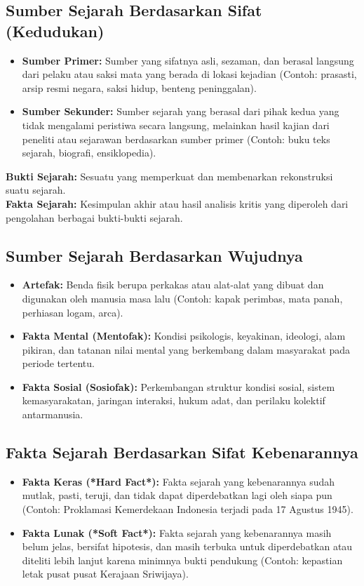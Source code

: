 \documentclass[12pt, a4paper]{article}
\begin{document}
\subsection{Sumber Sejarah Berdasarkan Sifat (Kedudukan)}
\begin{itemize}
	\item \textbf{Sumber Primer:} Sumber yang sifatnya asli, sezaman, dan berasal langsung dari pelaku atau saksi mata yang berada di lokasi kejadian (Contoh: prasasti, arsip resmi negara, saksi hidup, benteng peninggalan).
	\item \textbf{Sumber Sekunder:} Sumber sejarah yang berasal dari pihak kedua yang tidak mengalami peristiwa secara langsung, melainkan hasil kajian dari peneliti atau sejarawan berdasarkan sumber primer (Contoh: buku teks sejarah, biografi, ensiklopedia).
\end{itemize}
\noindent \textbf{Bukti Sejarah:} Sesuatu yang memperkuat dan membenarkan rekonstruksi suatu sejarah.\\
\noindent \textbf{Fakta Sejarah:} Kesimpulan akhir atau hasil analisis kritis yang diperoleh dari pengolahan berbagai bukti-bukti sejarah.

\subsection{Sumber Sejarah Berdasarkan Wujudnya}
\begin{itemize}
	\item \textbf{Artefak:} Benda fisik berupa perkakas atau alat-alat yang dibuat dan digunakan oleh manusia masa lalu (Contoh: kapak perimbas, mata panah, perhiasan logam, arca).
	\item \textbf{Fakta Mental (Mentofak):} Kondisi psikologis, keyakinan, ideologi, alam pikiran, dan tatanan nilai mental yang berkembang dalam masyarakat pada periode tertentu.
	\item \textbf{Fakta Sosial (Sosiofak):} Perkembangan struktur kondisi sosial, sistem kemasyarakatan, jaringan interaksi, hukum adat, dan perilaku kolektif antarmanusia.
\end{itemize}

\subsection{Fakta Sejarah Berdasarkan Sifat Kebenarannya}
\begin{itemize}
	\item \textbf{Fakta Keras (*Hard Fact*):} Fakta sejarah yang kebenarannya sudah mutlak, pasti, teruji, dan tidak dapat diperdebatkan lagi oleh siapa pun (Contoh: Proklamasi Kemerdekaan Indonesia terjadi pada 17 Agustus 1945).
	\item \textbf{Fakta Lunak (*Soft Fact*):} Fakta sejarah yang kebenarannya masih belum jelas, bersifat hipotesis, dan masih terbuka untuk diperdebatkan atau diteliti lebih lanjut karena minimnya bukti pendukung (Contoh: kepastian letak pusat pusat Kerajaan Sriwijaya).
\end{itemize}
\end{document}
